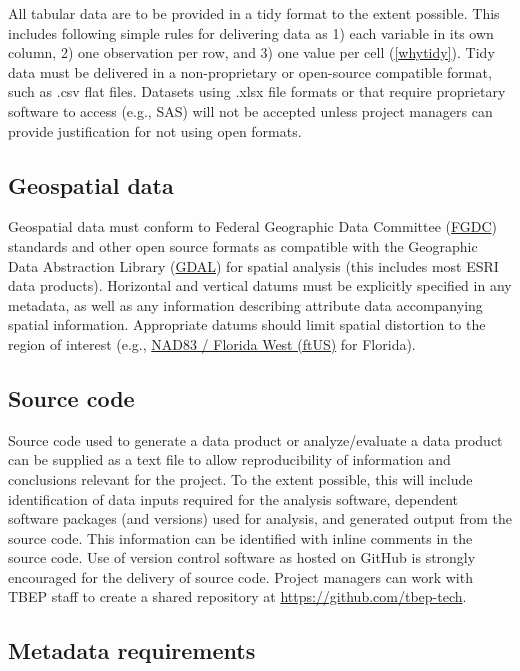 \documentclass[
]{book}
\begin{document}
All tabular data are to be provided in a tidy format to the extent possible. This includes following simple rules for delivering data as 1) each variable in its own column, 2) one observation per row, and 3) one value per cell (\ref{whytidy}). Tidy data must be delivered in a non-proprietary or open-source compatible format, such as .csv flat files. Datasets using .xlsx file formats or that require proprietary software to access (e.g., SAS) will not be accepted unless project managers can provide justification for not using open formats.

\subsection{Geospatial data}\label{geospatial-data}

Geospatial data must conform to Federal Geographic Data Committee (\href{https://www.fgdc.gov/standards}{FGDC}) standards and other open source formats as compatible with the Geographic Data Abstraction Library (\href{https://gdal.org/}{GDAL}) for spatial analysis (this includes most ESRI data products). Horizontal and vertical datums must be explicitly specified in any metadata, as well as any information describing attribute data accompanying spatial information. Appropriate datums should limit spatial distortion to the region of interest (e.g., \href{https://epsg.io/2237-1714}{NAD83 / Florida West (ftUS)} for Florida).

\subsection{Source code}\label{source-code}

Source code used to generate a data product or analyze/evaluate a data product can be supplied as a text file to allow reproducibility of information and conclusions relevant for the project. To the extent possible, this will include identification of data inputs required for the analysis software, dependent software packages (and versions) used for analysis, and generated output from the source code. This information can be identified with inline comments in the source code. Use of version control software as hosted on GitHub is strongly encouraged for the delivery of source code. Project managers can work with TBEP staff to create a shared repository at \url{https://github.com/tbep-tech}.

\subsection{Metadata requirements}\label{metadata-requirements}
\end{document}
